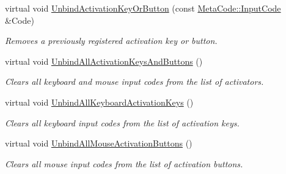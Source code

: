 \begin{DoxyCompactItemize}
virtual void \hyperlink{classMezzanine_1_1UI_1_1Button_ac4253cbf25d298280579fd2fe122b3e2}{UnbindActivationKeyOrButton} (const \hyperlink{classMezzanine_1_1MetaCode_a3b5633f0145bf3287cf53a3f05b5563c}{MetaCode::InputCode} \&Code)
\begin{DoxyCompactList}\small\item\em Removes a previously registered activation key or button. \item\end{DoxyCompactList}\item 
\hypertarget{classMezzanine_1_1UI_1_1Button_ae36443efdf271672157ae25a824d5cc5}{
virtual void \hyperlink{classMezzanine_1_1UI_1_1Button_ae36443efdf271672157ae25a824d5cc5}{UnbindAllActivationKeysAndButtons} ()}
\label{classMezzanine_1_1UI_1_1Button_ae36443efdf271672157ae25a824d5cc5}

\begin{DoxyCompactList}\small\item\em Clears all keyboard and mouse input codes from the list of activators. \item\end{DoxyCompactList}\item 
\hypertarget{classMezzanine_1_1UI_1_1Button_a30c1a1380667e42677b799cfa58c96ee}{
virtual void \hyperlink{classMezzanine_1_1UI_1_1Button_a30c1a1380667e42677b799cfa58c96ee}{UnbindAllKeyboardActivationKeys} ()}
\label{classMezzanine_1_1UI_1_1Button_a30c1a1380667e42677b799cfa58c96ee}

\begin{DoxyCompactList}\small\item\em Clears all keyboard input codes from the list of activation keys. \item\end{DoxyCompactList}\item 
\hypertarget{classMezzanine_1_1UI_1_1Button_a759f6fd2a76b68ef3aae1bb8c2677cf7}{
virtual void \hyperlink{classMezzanine_1_1UI_1_1Button_a759f6fd2a76b68ef3aae1bb8c2677cf7}{UnbindAllMouseActivationButtons} ()}
\label{classMezzanine_1_1UI_1_1Button_a759f6fd2a76b68ef3aae1bb8c2677cf7}

\begin{DoxyCompactList}\small\item\em Clears all mouse input codes from the list of activation buttons. \item\end{DoxyCompactList}\end{DoxyCompactItemize}
